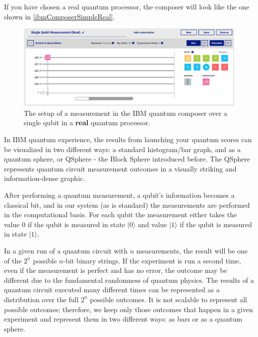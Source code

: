 \documentclass[a4paper,10pt]{article}
\begin{document}
If you have chosen a real quantum processor, the composer will look like the one shown in \autoref{ibmComposerSimpleReal}.
\begin{figure}[!htb]
\begin{center}
\includegraphics[width=4.7in]{images/ibmComposerSimpleReal.png}
\caption{The setup of a measurement in the IBM quantum composer over a single qubit in a \textbf{real} quantum processor.}
\label{ibmComposerSimpleReal}
\end{center}
\end{figure}

In IBM quantum experience, the results from launching your quantum scores can be visualized in two different ways: a standard histogram/bar graph, and as a quantum sphere, or QSphere - the Block Sphere introduced before. The QSphere represents quantum circuit measurement outcomes in a visually striking and information-dense graphic.

After performing a quantum measurement, a qubit's information becomes a classical bit, and in our system (as is standard) the measurements are performed in the computational basis. For each qubit the measurement either takes the value 0 if the qubit is measured in state $|0\rangle$ and value $|1\rangle$ if the qubit is measured in state $|1\rangle$.

In a given run of a quantum circuit with $n$ measurements, the result will be one of the $2^n$ possible $n$-bit binary strings. If the experiment is run a second time, even if the measurement is perfect and has no error, the outcome may be different due to the fundamental randomness of quantum physics. The results of a quantum circuit executed many different times can be represented as a distribution over the full $2^n$ possible outcomes. It is not scalable to represent all possible outcomes; therefore, we keep only those outcomes that happen in a given experiment and represent them in two different ways: as bars or as a quantum sphere.
\end{document}
